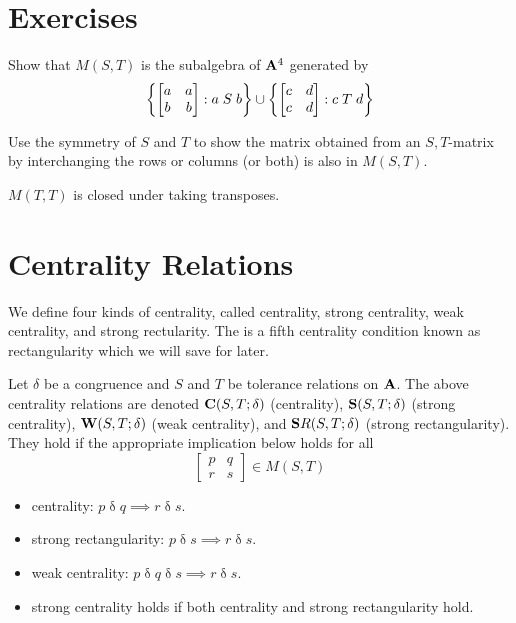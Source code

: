   \section*{Exercises}
  
  \begin{exercises}
  
  \prob
  Show that $M(S,T)$ is the subalgebra of $\mathbf{A}^4$ generated by
  \[
  \left\{
  \begin{bmatrix}
  a&a\\
  b&b
  \end{bmatrix} : a \mathrel{S} b\right\}
  \union
  \left\{
  \begin{bmatrix}
  c&d\\
  c&d
  \end{bmatrix} : c \mathrel{T} d\right\}
  \]
  
  \prob
  Use the symmetry of $S$ and $T$ to show the matrix obtained from an
  $S,T$-matrix by interchanging the rows or columns (or both) is also
  in $M(S,T)$.
  
  \prob
  $M(T,T)$ is closed under taking transposes.
  
  \end{exercises}
  
  \section*{Centrality Relations}
  
  We define four kinds of centrality, called centrality, strong
  centrality, weak centrality, and strong rectularity. The is a fifth
  centrality condition known as rectangularity which we will save for
  later.
  
  Let $\delta$ be a congruence and $S$ and $T$ be
  tolerance relations on  $\mathbf{A}$. The above centrality relations
  are denoted $\mathbf{C}(S,T;\delta)$ (centrality),
  $\mathbf{S}(S,T;\delta)$ (strong centrality),
  $\mathbf{W}(S,T;\delta)$ (weak centrality),  and
  $\mathbf{S}R(S,T;\delta)$ (strong rectangularity). They hold if the
  appropriate implication below holds for all
  \[
  \begin{bmatrix}
  p&q\\
  r&s
  \end{bmatrix} \in M(S,T)
  \]
  \begin{itemize}
  \item centrality:
  $p \mathrel{\delta} q \implies r \mathrel{\delta} s$.
  \item strong rectangularity:
  $p \mathrel{\delta} s \implies r \mathrel{\delta} s$.
  \item weak centrality:
  $p \mathrel{\delta} q \mathrel{\delta} s \implies r \mathrel{\delta} s$.
  \item strong centrality holds if both centrality and strong
  rectangularity hold.
  \end{itemize}
  
